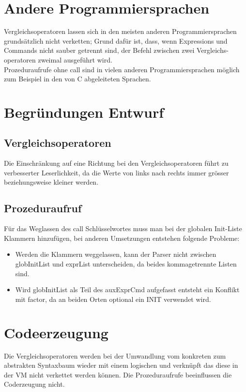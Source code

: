 \documentclass[a4paper,10pt]{article}
\begin{document}
\section{Andere Programmiersprachen}
Vergleichsoperatoren lassen sich in den meisten anderen Programmiersprachen grunds\"atzlich nicht verketten; Grund daf\"ur ist, dass, wenn Expressions und Commands nicht sauber getrennt sind, der Befehl zwischen zwei Vergleichs-operatoren zweimal ausgef\"uhrt wird.\\
Prozeduraufrufe ohne call sind in vielen anderen Programmiersprachen
m\"oglich zum Beispiel in den von C abgeleiteten Sprachen.
\section{Begr\"undungen Entwurf}
\subsection{Vergleichsoperatoren}
Die Einschr\"ankung auf eine Richtung bei den Vergleichsoperatoren
f\"uhrt zu verbesserter Leserlichkeit, da die Werte von links nach 
rechts immer gr\"osser beziehungsweise kleiner werden.
\subsection{Prozeduraufruf}
F\"ur das Weglassen des call Schl\"usselwortes muss man bei der 
globalen Init-Liste Klammern hinzuf\"ugen, bei anderen Umsetzungen 
entstehen folgende Probleme:\\
\begin{itemize}
\item Werden die Klammern weggelassen, kann der Parser nicht zwischen
globInitList und exprList unterscheiden, da beides kommagetrennte
Listen sind.
\item Wird globInitList als Teil des auxExprCmd aufgefasst entsteht
ein Konflikt mit factor, da an beiden Orten optional ein INIT
verwendet wird.
\end{itemize}
\section{Codeerzeugung}
Die Vergleichsoperatoren werden bei der Umwandlung vom konkreten zum abstrakten Syntaxbaum wieder mit einem logischen und verknüpft das diese in der VM nicht verkettet werden können.
Die Prozeduraufrufe beeinflussen die Coderzeugung nicht.
\end{document}
